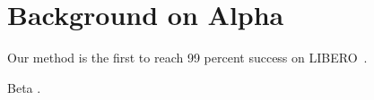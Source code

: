 \documentclass{article}
\newcommand{\libero}{LIBERO~\cite{ka}}
\begin{document}
\section{Background on Alpha \cite{ka}}

Our method is the first to reach 99 percent success on \libero.

Beta \cite{kb}.


\end{document}
